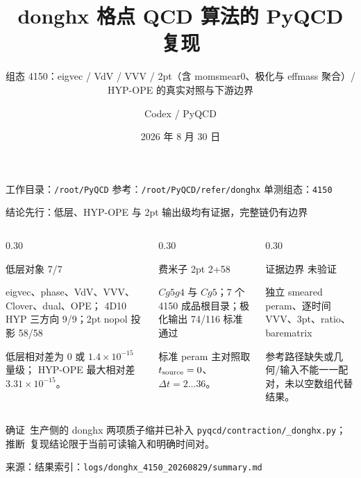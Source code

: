 \documentclass[UTF8,aspectratio=169,11pt]{ctexbeamer}
\title[4150 donghx 复现]{donghx 格点 QCD 算法的 PyQCD 复现}
\subtitle{组态 4150：eigvec / VdV / VVV / 2pt（含 momsmear0、极化与 effmass 聚合）/ HYP-OPE 的真实对照与下游边界}
\author[Codex]{Codex / PyQCD}
\institute{格点 QCD：蒸馏、质子相关函数与胶子算符}
\date{2026 年 8 月 30 日}
\newcommand{\source}[1]{\vspace{0.05em}\par{\raggedright\scriptsize\color{muted}来源：#1\par}}
\newcommand{\codepath}[1]{\nolinkurl{#1}}
\newcommand{\verified}{\textcolor{evidence}{确证}}
\newcommand{\inferred}{\textcolor{accent}{推断}}
\begin{document}
\begin{frame}[plain]
  \titlepage
  \vfill
  \begin{center}
    \small 工作目录：\codepath{/root/PyQCD}\quad
    参考：\codepath{/root/PyQCD/refer/donghx}\quad
    单测组态：\texttt{4150}
  \end{center}
\end{frame}

\begin{frame}[t]{结论先行：低层、HYP-OPE 与 2pt 输出级均有证据，完整链仍有边界}
  \begin{columns}[T,totalwidth=\textwidth]
    \begin{column}{0.30\textwidth}
      \begin{block}{低层对象}
        \centering\Large\textcolor{evidence}{7/7}\par\normalsize
        eigvec、phase、VdV、VVV、Clover、dual、OPE；\newline
        4D10 HYP 三方向 9/9；2pt nopol 投影 58/58
      \end{block}
    \footnotesize 低层相对差为 $0$ 或 $1.4\times10^{-15}$ 量级；\newline
    HYP-OPE 最大相对差 $3.31\times10^{-15}$。
    \end{column}
    \begin{column}{0.30\textwidth}
      \begin{block}{费米子 2pt}
        \centering\Large\textcolor{evidence}{2+58}\par\normalsize
        $Cg5g4$ 与 $Cg5$；7 个 4150 成品根目录；极化输出 74/116 标准通过
      \end{block}
      \footnotesize 标准 peram 主对照取 $t_{\rm source}=0$、$\Delta t=2\ldots36$。
    \end{column}
    \begin{column}{0.30\textwidth}
      \begin{block}{证据边界}
        \centering\Large\textcolor{warning}{未验证}\par\normalsize
        独立 smeared peram、逐时间 VVV、3pt、ratio、barematrix
      \end{block}
      \small 参考路径缺失或几何/输入不能一一配对，未以空数组代替结果。
    \end{column}
  \end{columns}
  \vfill
  \colorbox{good}{\parbox{0.94\linewidth}{\centering
    \verified\ 生产侧的 donghx 两项质子缩并已补入 \codepath{pyqcd/contraction/_donghx.py}；
    \inferred\ 复现结论限于当前可读输入和明确时间对。}}
  \vspace{-0.18em}
  \source{结果索引：\codepath{logs/donghx_4150_20260829/summary.md}}
\end{frame}
\end{document}
